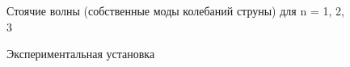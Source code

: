 \documentclass[a4paper, 12pt]{article}%
\begin{document}
	\begin{figure}[h]
		\caption{Стоячие волны (собственные моды колебаний струны) для n = 1, 2, 3}
	\end{figure}
    \begin{figure}[H]
    	\caption{ Экспериментальная установка}
    \end{figure}
\end{document}
